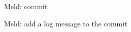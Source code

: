 \documentclass[12pt]{beamer}
\begin{document}
\begin{frame}[fragile]
	\begin{block}{Meld: commit}
	\end{block}
\end{frame}

\begin{frame}[fragile]
	\begin{block}{Meld: add a log message to the commit}
	\end{block}
\end{frame}
\end{document}
